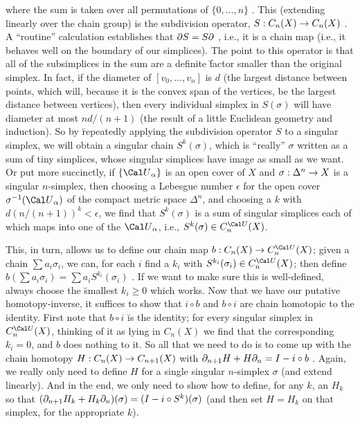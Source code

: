 
where the sum is taken over all permutations of $\{0,\ldots ,n\}$ .
This (extending linearly over the chain group) is the subdivision operator, $S:C_n(X)\rightarrow C_n(X)$ . 
A ``routine'' calculation establishes that $\partial S = S\partial$ , i.e., it is a chain map
(i.e., it behaves well on the boundary of our simplices). The point to this operator is that all of the 
subsimplices in the sum are a definite \u{factor} smaller than the original simplex. In fact,
if the diameter of $[v_0,\ldots ,v_n]$ is $d$ (the largest distance between points, which will,
because it is the convex span of the vertices, be the largest distance between vertices), then
every individual simplex in $S(\sigma)$ will have diameter at most $nd/(n+1)$ (the result of a little
Euclidean geometry and induction). So by \u{repeatedly} applying the subdivision operator
$S$ to a singular simplex, we will obtain a singular chain $S^k(\sigma)$,
which is ``really'' $\sigma$ written as a sum of tiny simplices, whose singular simplices 
have image as small as we want. Or put more succinctly, if $\{{\Cal U}_\alpha\}$ is an open cover of $X$
and $\sigma:\Delta^n\rightarrow X$ is a singular $n$-simplex, then choosing a Lebesgue number $\epsilon$ for
the open cover $\sigma^{-1}({\Cal U}_\alpha)$ of the compact metric space $\Delta^n$, and choosing 
a $k$ with $d(n/(n+1))^k<\epsilon$, we find that $S^k(\sigma)$ is a sum of singular simplices
each of which maps into one of the ${\Cal U}_\alpha$, i.e., $S^k(\sigma)\in C_n^{\Cal U}(X)$.

\msk

This, in turn, allows us to define our chain map $b:C_n(X)\ra C_n^{\Cal U}(X)$; 
given a chain $\sum a_i \sigma_i$, we can, for each $i$ find a $k_i$ with $S^{k_i}(\sigma_i)\in C_n^{\Cal U}(X)$;
then define $b(\sum a_i \sigma_i) = \sum a_i S^{k_i}(\sigma_i)$ . If we want to make sure this is well-defined,
always choose the \u{smallest} $k_i\geq 0$ which works. Now that we have our putative homotopy-inverse,
it suffices to show that $i\circ b$ and $b\circ i$ are chain homotopic to the identity. First note that
$b\circ i$ \u{is} the identity; for every singular simplex in $C_n^{\Cal U}(X)$, 
thinking of it as lying in $C_n(X)$ we find that the corresponding $k_i=0$,
and $b$ does nothing to it. So all that we need to do is to come up with the chain homotopy
$H:C_n(X)\rightarrow C_{n+1}(X)$ with $\partial_{n+1}H+H\partial_n = I-i\circ b$ . Again, we really only need to define
$H$ for a single singular $n$-simplex $\sigma$ (and extend linearly). And in the end, we only need to show how 
to define, for any $k$, an $H_k$ so that $(\partial_{n+1}H_k+H_k\partial_n)(\sigma) = (I-i\circ S^k)(\sigma)$ 
(and then set $H=H_k$ on that simplex, for the appropriate $k$).

